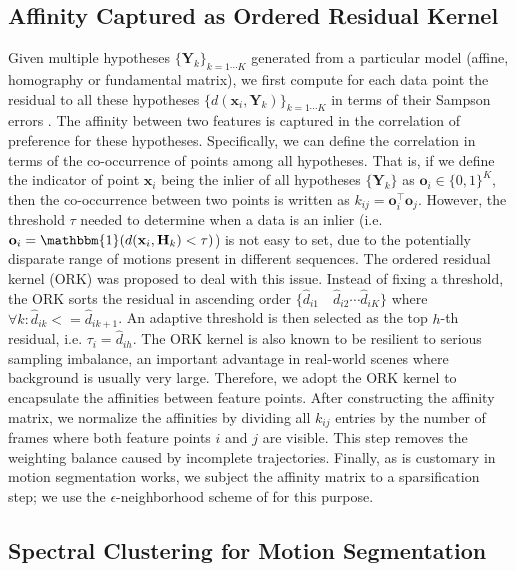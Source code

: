 \documentclass[10pt,twocolumn,letterpaper]{article}
\newcommand{\scal}[1]{\mathit{#1}}
\newcommand{\vect}[1]{\mathbf{#1}}
\newcommand{\matr}[1]{\mathbf{#1}}
\begin{document}
\subsection{Affinity Captured as Ordered Residual Kernel}

Given multiple hypotheses $\{\matr{Y}_k\}_{k=1\cdots K}$ generated from a particular model (affine, homography or fundamental matrix), we first compute for each data point the residual to all these hypotheses $\{d(\vect{x}_i,\matr{Y}_k)\}_{k=1\cdots K}$ in terms of their Sampson errors \cite{hartley2003multiple}. The affinity between two features is captured in the correlation of preference for these hypotheses. Specifically, we can define the correlation in terms of the co-occurrence of points among all hypotheses. That is, if we define the indicator of point $\vect{x}_i$ being the inlier of all hypotheses $\{\matr{Y}_k\}$ as $\vect{o}_i\in\{0,1\}^{\scal{K}}$, then the co-occurrence between two points is written as $k_{ij}=\vect{o}_i^\top\vect{o}_j$. 
However, the threshold $\tau$ needed to determine when a data is an inlier (i.e. $\vect{o}_i=\mathbbm{1}(d(\vect{x}_i,\matr{H}_k)<\tau)$) is not easy to set, due to the potentially disparate range of motions present in different sequences.
The ordered residual kernel (ORK) \cite{Chin2009,Lai2017} was proposed to deal with this issue. Instead of fixing a threshold, the ORK sorts the residual in ascending order $\{\hat{d}_{i1} \quad \hat{d}_{i2} \cdots \hat{d}_{iK}\}$ where $\forall k : \hat{d}_{ik}<=\hat{d}_{ik+1}$. An adaptive threshold is then selected as the top $h$-th residual, i.e. $\tau_i=\hat{d}_{ih}$. The ORK kernel is also known to be resilient to serious sampling imbalance, an important advantage in real-world scenes where background is usually very large. Therefore, we adopt the ORK kernel to encapsulate the affinities between feature points. After constructing the affinity matrix, we normalize the affinities by dividing all $k_{ij}$ entries by the number of frames where both feature points $i$ and $j$ are visible. This step removes the weighting balance caused by incomplete trajectories. 
Finally, as is customary in motion segmentation works, we subject the affinity matrix to a sparsification step; we use the $\epsilon$-neighborhood scheme of \cite{Lai2017} for this purpose.

\subsection{Spectral Clustering for Motion Segmentation}
\end{document}
